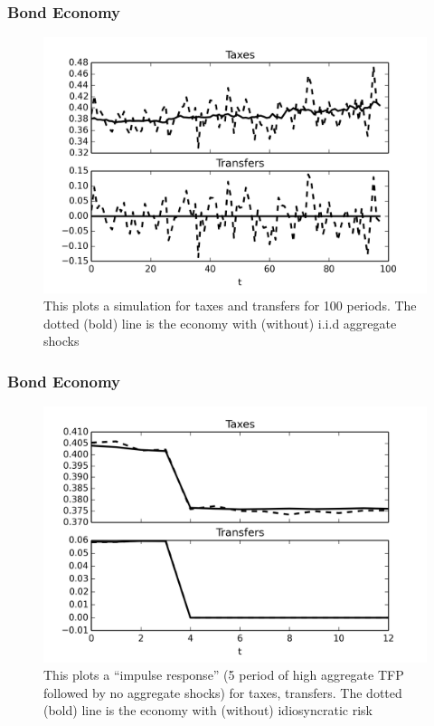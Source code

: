 \documentclass{beamer}
\begin{document}
\begin{frame}
\frametitle{Bond Economy}
\begin{figure}[htp]
\includegraphics[width=\textwidth]{policy_long_sample_plot_data_bond_economy.png}
\caption{\tiny{This plots a simulation for taxes and transfers for 100 periods. The dotted (bold) line is the economy with (without) i.i.d aggregate shocks}}
\label{fig:}
\end{figure} 
\end{frame}
 
\begin{frame}
 \frametitle{Bond Economy}
\begin{figure}[htp]
\includegraphics[width=\textwidth]{policy_irf_high_plot_data_bond_economy.png}
\caption{\tiny{This plots a ``impulse response'' (5 period of high aggregate TFP followed by no aggregate shocks) for taxes, transfers. The dotted (bold) line is the economy with (without) idiosyncratic risk}}
\label{fig:}
\end{figure}


 \end{frame}
 
\end{document}
